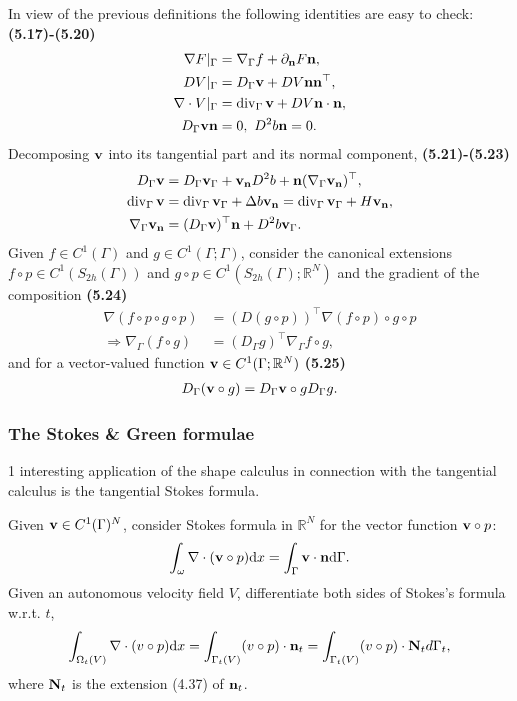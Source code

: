 \documentclass[oneside]{book}
\numberwithin{equation}{section}
\begin{document}
In view of the previous definitions the following identities are easy to check: \textbf{(5.17)-(5.20)}
\begin{align*}
    \nabla F|_\Gamma &= \nabla_\Gamma f + \partial_{\bf n}F{\bf n},\\
    DV|_\Gamma &= D_\Gamma{\bf v} + DV{\bf n}{\bf n}^\top,\\
    \nabla\cdot V|_\Gamma &= \operatorname{div}_\Gamma{\bf v} + DV{\bf n}\cdot{\bf n},\\
    D_\Gamma{\bf v}{\bf n} &= 0,\ D^2b{\bf n} = 0.
\end{align*}
Decomposing ${\bf v}$ into its tangential part and its normal component, \textbf{(5.21)-(5.23)}
\begin{align*}
    D_\Gamma{\bf v} &= D_\Gamma{\bf v}_\Gamma + {\bf v}_{\bf n}D^2b + {\bf n}(\nabla_\Gamma{\bf v}_{\bf n})^\top,\\
    \operatorname{div}_\Gamma{\bf v} &= \operatorname{div}_\Gamma{\bf v}_\Gamma + \Delta b{\bf v}_{\bf n} = \operatorname{div}_\Gamma{\bf v}_\Gamma + H{\bf v}_{\bf n},\\
    \nabla_\Gamma{\bf v}_{\bf n} &= (D_\Gamma{\bf v})^\top{\bf n} + D^2b{\bf v}_\Gamma.
\end{align*}
Given $f\in C^1(\Gamma)$ and $g\in C^1(\Gamma;\Gamma)$, consider the canonical extensions $f\circ p\in C^1(S_{2h}(\Gamma))$ and $g\circ p\in C^1(S_{2h}(\Gamma);\mathbb{R}^N)$ and the gradient of the composition \textbf{(5.24)}
\begin{align*}
    \nabla(f\circ p\circ g\circ p) &= (D(g\circ p))^\top\nabla(f\circ p)\circ g\circ p\\
    \Rightarrow\nabla_\Gamma(f\circ g) &= (D_\Gamma g)^\top\nabla_\Gamma f\circ g,
\end{align*}
and for a vector-valued function ${\bf v}\in C^1(\Gamma;\mathbb{R}^N)$ \textbf{(5.25)}
\begin{align*}
    D_\Gamma({\bf v}\circ g) = D_\Gamma{\bf v}\circ gD_\Gamma g.
\end{align*}

\subsubsection{The Stokes \& Green formulae}
1 interesting application of the shape calculus in connection with the tangential calculus is the tangential Stokes formula.

Given ${\bf v}\in C^1(\Gamma)^N$, consider Stokes formula in $\mathbb{R}^N$ for the vector function ${\bf v}\circ p$:
\begin{align*}
    \int_\omega \nabla\cdot({\bf v}\circ p){\rm d}x = \int_\Gamma {\bf v}\cdot{\bf n}{\rm d}\Gamma.
\end{align*}
Given an autonomous velocity field $V$, differentiate both sides of Stokes's formula w.r.t. $t$,
\begin{align*}
    \int_{\Omega_t(V)} \nabla\cdot(v\circ p){\rm d}x = \int_{\Gamma_t(V)} (v\circ p)\cdot{\bf n}_t = \int_{\Gamma_t(V)} (v\circ p)\cdot{\bf N}_t{\rm }d\Gamma_t,
\end{align*}
where ${\bf N}_t$ is the extension (4.37) of ${\bf n}_t$.
\end{document}
